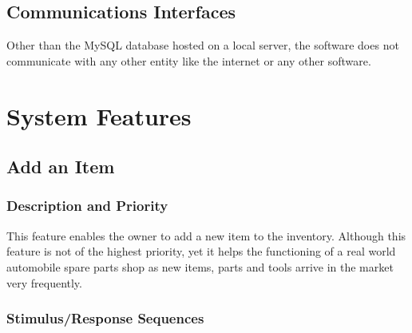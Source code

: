 \documentclass{scrreprt}
\begin{document}
\section{Communications Interfaces}
Other than the MySQL database hosted on a local server, the software does not communicate with any other entity like the internet or any other software. 

\chapter{System Features}

\section{Add an Item}

\subsection{Description and Priority}

This feature enables the owner to add a new item to the inventory. Although this feature is not of the highest priority, yet it helps the functioning of a real world automobile spare parts shop as new items, parts and tools arrive in the market very frequently.

\subsection{Stimulus/Response Sequences}
\end{document}
